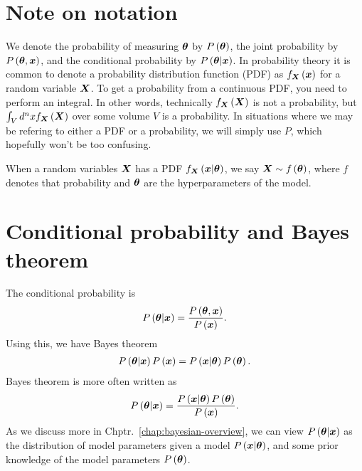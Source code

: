 \section{Note on notation}

We denote the probability of measuring ${\bm \theta}$ by $P\left({\bm \theta}\right)$,
the joint probability by $P\left({\bm \theta},{\bm x}\right)$, 
and the conditional probability by $P\left({\bm \theta}|{\bm x}\right)$.
In probability theory it is common to denote a probability distribution
function (PDF) as $f_{{\bm X}}\left({\bm x}\right)$ for a random variable ${\bm X}$.
To get a probability from a continuous PDF, you need to perform an integral.
In other words, technically $f_{{\bm X}}\left({\bm X}\right)$ is not a probability,
but $\int_{V} d^nx f_{{\bm X}}\left({\bm X}\right)$ over some volume $V$ is a probability.
In situations where we may be refering to either a PDF or a probability,
we will simply use $P$, which hopefully won't be too confusing. 

When a random variables ${\bm X}$ has a PDF $f_{{\bm X}}\left({\bm x}|{\bm \theta}\right)$,
we say ${\bm X} \sim f\left({\bm \theta}\right)$, where $f$ denotes that probability
and ${\bm \theta}$ are the hyperparameters of the model.

\section{Conditional probability and Bayes theorem}

The conditional probability is
\begin{align}
    P\left({\bm \theta}|{\bm x}\right)
    =
    \frac{P\left({\bm \theta},{\bm x}\right)}{P\left({\bm x}\right)}
    .
\end{align}
Using this, we have Bayes theorem
\begin{align}
    \label{eq:Bayes-theorem-1}
    P\left({\bm \theta}|{\bm x}\right)P\left({\bm x}\right)
    =
    P\left({\bm x}|{\bm \theta}\right)P\left({\bm \theta}\right)
    .
\end{align}
Bayes theorem is more often written as
\begin{align}
    \label{eq:Bayes-theorem-2}
    P\left({\bm \theta}|{\bm x}\right)
    =
    \frac{
        P\left({\bm x}|{\bm \theta}\right)P\left({\bm \theta}\right)
    }{
        P\left({\bm x}\right)
    }
    .
\end{align}
As we discuss more in Chptr.~\ref{chap:bayesian-overview}, 
we can view $P\left({\bm \theta}|{\bm x}\right)$ as the distribution of
model parameters given a model $P\left({\bm x}|{\bm \theta}\right)$,
and some prior knowledge of the model parameters $P\left({\bm \theta}\right)$.
